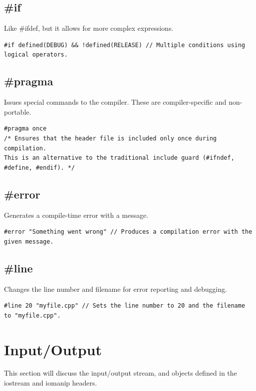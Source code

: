 \documentclass{report}
\begin{document}
    \bigbreak \noindent 
    \subsection{\#if}
    \bigbreak \noindent 
    Like \#ifdef, but it allows for more complex expressions.
    \bigbreak \noindent 
    \sepline
    \begin{verbatim}
#if defined(DEBUG) && !defined(RELEASE) // Multiple conditions using logical operators.
    \end{verbatim}
    \sepline

    \bigbreak \noindent 
    \subsection{\#pragma}
    \bigbreak \noindent 
    Issues special commands to the compiler. These are compiler-specific and non-portable.
    \bigbreak \noindent 
    \sepline
    \begin{verbatim}
#pragma once 
/* Ensures that the header file is included only once during compilation. 
This is an alternative to the traditional include guard (#ifndef, #define, #endif). */
    \end{verbatim}
    \sepline

    \bigbreak \noindent 
    \subsection{\#error}
    \bigbreak \noindent 
    Generates a compile-time error with a message.
    \bigbreak \noindent 
    \sepline
    \begin{verbatim}
#error "Something went wrong" // Produces a compilation error with the given message.
    \end{verbatim}
    \sepline

    \bigbreak \noindent 
    \subsection{\#line}
    \bigbreak \noindent 
    Changes the line number and filename for error reporting and debugging.
    \bigbreak \noindent 
    \sepline
    \begin{verbatim}
#line 20 "myfile.cpp" // Sets the line number to 20 and the filename to "myfile.cpp".
    \end{verbatim}
    \sepline

    \pagebreak \bigbreak \noindent 
    \section{\LARGE Input/Output}
    \bigbreak \noindent 
    This section will discuss the input/output stream, and objects defined in the iostream and iomanip headers.
    \bigbreak \noindent 
\end{document}
